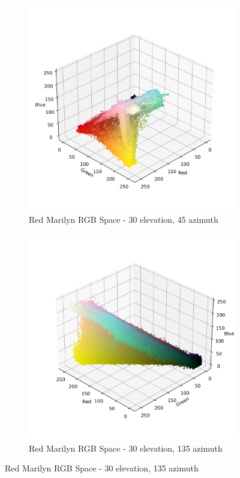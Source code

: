 \documentclass{article}
\begin{document}
\begin{figure}[ht]
  \centering
  \begin{subfigure}{0.45\textwidth}
    \includegraphics[width=\textwidth]{main_files/figure-latex/4_5_red_marilyn_original_scatter.jpg}
    \caption{Red Marilyn RGB Space - 30 \degree elevation, 45 \degree azimuth}
    \label{fig:4_5_red_marilyn_original_scatter}
  \end{subfigure}
  \hfill
  \begin{subfigure}{0.45\textwidth}
    \includegraphics[width=\textwidth]{main_files/figure-latex/4_6_red_marilyn_original_scatter.jpg}
    \caption{Red Marilyn RGB Space - 30 \degree elevation, 135 \degree azimuth}
    \label{fig:4_6_red_marilyn_original_scatter}
  \end{subfigure}
  \label{fig:red_marilyn_original_scatter_1}
\end{figure}
\end{document}
